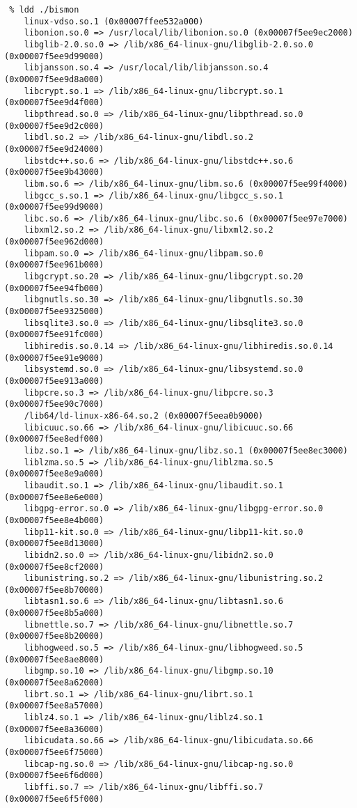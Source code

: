 \begin{appendices}
\begin{verbatim}
 % ldd ./bismon
	linux-vdso.so.1 (0x00007ffee532a000)
	libonion.so.0 => /usr/local/lib/libonion.so.0 (0x00007f5ee9ec2000)
	libglib-2.0.so.0 => /lib/x86_64-linux-gnu/libglib-2.0.so.0 (0x00007f5ee9d99000)
	libjansson.so.4 => /usr/local/lib/libjansson.so.4 (0x00007f5ee9d8a000)
	libcrypt.so.1 => /lib/x86_64-linux-gnu/libcrypt.so.1 (0x00007f5ee9d4f000)
	libpthread.so.0 => /lib/x86_64-linux-gnu/libpthread.so.0 (0x00007f5ee9d2c000)
	libdl.so.2 => /lib/x86_64-linux-gnu/libdl.so.2 (0x00007f5ee9d24000)
	libstdc++.so.6 => /lib/x86_64-linux-gnu/libstdc++.so.6 (0x00007f5ee9b43000)
	libm.so.6 => /lib/x86_64-linux-gnu/libm.so.6 (0x00007f5ee99f4000)
	libgcc_s.so.1 => /lib/x86_64-linux-gnu/libgcc_s.so.1 (0x00007f5ee99d9000)
	libc.so.6 => /lib/x86_64-linux-gnu/libc.so.6 (0x00007f5ee97e7000)
	libxml2.so.2 => /lib/x86_64-linux-gnu/libxml2.so.2 (0x00007f5ee962d000)
	libpam.so.0 => /lib/x86_64-linux-gnu/libpam.so.0 (0x00007f5ee961b000)
	libgcrypt.so.20 => /lib/x86_64-linux-gnu/libgcrypt.so.20 (0x00007f5ee94fb000)
	libgnutls.so.30 => /lib/x86_64-linux-gnu/libgnutls.so.30 (0x00007f5ee9325000)
	libsqlite3.so.0 => /lib/x86_64-linux-gnu/libsqlite3.so.0 (0x00007f5ee91fc000)
	libhiredis.so.0.14 => /lib/x86_64-linux-gnu/libhiredis.so.0.14 (0x00007f5ee91e9000)
	libsystemd.so.0 => /lib/x86_64-linux-gnu/libsystemd.so.0 (0x00007f5ee913a000)
	libpcre.so.3 => /lib/x86_64-linux-gnu/libpcre.so.3 (0x00007f5ee90c7000)
	/lib64/ld-linux-x86-64.so.2 (0x00007f5eea0b9000)
	libicuuc.so.66 => /lib/x86_64-linux-gnu/libicuuc.so.66 (0x00007f5ee8edf000)
	libz.so.1 => /lib/x86_64-linux-gnu/libz.so.1 (0x00007f5ee8ec3000)
	liblzma.so.5 => /lib/x86_64-linux-gnu/liblzma.so.5 (0x00007f5ee8e9a000)
	libaudit.so.1 => /lib/x86_64-linux-gnu/libaudit.so.1 (0x00007f5ee8e6e000)
	libgpg-error.so.0 => /lib/x86_64-linux-gnu/libgpg-error.so.0 (0x00007f5ee8e4b000)
	libp11-kit.so.0 => /lib/x86_64-linux-gnu/libp11-kit.so.0 (0x00007f5ee8d13000)
	libidn2.so.0 => /lib/x86_64-linux-gnu/libidn2.so.0 (0x00007f5ee8cf2000)
	libunistring.so.2 => /lib/x86_64-linux-gnu/libunistring.so.2 (0x00007f5ee8b70000)
	libtasn1.so.6 => /lib/x86_64-linux-gnu/libtasn1.so.6 (0x00007f5ee8b5a000)
	libnettle.so.7 => /lib/x86_64-linux-gnu/libnettle.so.7 (0x00007f5ee8b20000)
	libhogweed.so.5 => /lib/x86_64-linux-gnu/libhogweed.so.5 (0x00007f5ee8ae8000)
	libgmp.so.10 => /lib/x86_64-linux-gnu/libgmp.so.10 (0x00007f5ee8a62000)
	librt.so.1 => /lib/x86_64-linux-gnu/librt.so.1 (0x00007f5ee8a57000)
	liblz4.so.1 => /lib/x86_64-linux-gnu/liblz4.so.1 (0x00007f5ee8a36000)
	libicudata.so.66 => /lib/x86_64-linux-gnu/libicudata.so.66 (0x00007f5ee6f75000)
	libcap-ng.so.0 => /lib/x86_64-linux-gnu/libcap-ng.so.0 (0x00007f5ee6f6d000)
	libffi.so.7 => /lib/x86_64-linux-gnu/libffi.so.7 (0x00007f5ee6f5f000)
\end{verbatim}


\end{appendices}
